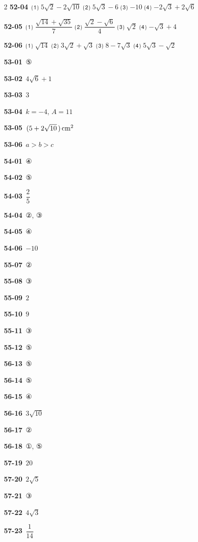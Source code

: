 \documentclass[10pt,a4paper]{article}
\begin{document}
\begin{multicols}{2}
\noindent\textbf{52-04}\ ⑴ $5\sqrt{2}-2\sqrt{10}$ ⑵ $5\sqrt{3}-6$ ⑶ $-10$ ⑷ $-2\sqrt{3}+2\sqrt{6}$\par
\noindent\textbf{52-05}\ ⑴ $\dfrac{\sqrt{14}+\sqrt{35}}{7}$ ⑵ $\dfrac{\sqrt{2}-\sqrt{6}}{4}$ ⑶ $\sqrt{2}$ ⑷ $-\sqrt{3}+4$\par
\noindent\textbf{52-06}\ ⑴ $\sqrt{14}$ ⑵ $3\sqrt{2}+\sqrt{3}$ ⑶ $8-7\sqrt{3}$ ⑷ $5\sqrt{3}-\sqrt{2}$\par
\noindent\textbf{53-01}\ ⑤\par
\noindent\textbf{53-02}\ $4\sqrt{6}+1$\par
\noindent\textbf{53-03}\ $3$\par
\noindent\textbf{53-04}\ $k=-4$, $A=11$\par
\noindent\textbf{53-05}\ $(5+2\sqrt{10}\mkern3mu )\mkern3mu \mathrm{cm}^2$\par
\noindent\textbf{53-06}\ $a>b>c$\par
\noindent\textbf{54-01}\ ④\par
\noindent\textbf{54-02}\ ⑤\par
\noindent\textbf{54-03}\ $\dfrac{2}{5}$\par
\noindent\textbf{54-04}\ ②, ③\par
\noindent\textbf{54-05}\ ④\par
\noindent\textbf{54-06}\ $-10$\par
\noindent\textbf{55-07}\ ②\par
\noindent\textbf{55-08}\ ③\par
\noindent\textbf{55-09}\ $2$\par
\noindent\textbf{55-10}\ $9$\par
\noindent\textbf{55-11}\ ③\par
\noindent\textbf{55-12}\ ⑤\par
\noindent\textbf{56-13}\ ⑤\par
\noindent\textbf{56-14}\ ⑤\par
\noindent\textbf{56-15}\ ④\par
\noindent\textbf{56-16}\ $3\sqrt{10}$\par
\noindent\textbf{56-17}\ ②\par
\noindent\textbf{56-18}\ ①, ⑤\par
\noindent\textbf{57-19}\ $20$\par
\noindent\textbf{57-20}\ $2\sqrt{5}$\par
\noindent\textbf{57-21}\ ③\par
\noindent\textbf{57-22}\ $4\sqrt{3}$\par
\noindent\textbf{57-23}\ $\dfrac{1}{14}$\par

\end{multicols}
\end{document}
